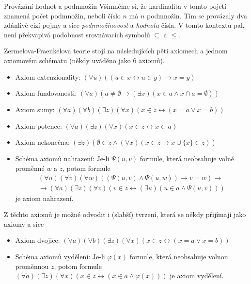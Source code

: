 \begin{myremark}{Provázání hodnot a podmnožin}\label{pozn:kard_podm}
Všimněme si, že kardinalita v tomto pojetí znamená počet podmnožin, neboli číslo $n$ má $n$ podmnožin. Tím se provázaly dva zdánlivě cizí pojmy a sice \textit{podmnožinovost} a \textit{hodnota} čísla. V tomto kontextu pak není překvapivá podobnost srovnávacích symbolů $\subseteq$ a $\leq$.
\end{myremark}

Zermelova-Fraenkelova teorie stojí na následujících pěti axiomech a jednom axiomovém schématu (někdy uváděno jako 6 axiomů).

\begin{itemize}
\item Axiom extenzionality: $(\forall u)((u \in x \leftrightarrow u \in y) \rightarrow x = y)$
\item Axiom fundovanosti: $ (\forall a)(a \neq \emptyset \rightarrow (\exists x)(x \in a \land x \cap a = \emptyset))$
\item Axiom sumy: $(\forall a)(\forall b)(\exists z)(\forall x)(x \in z \leftrightarrow (x = a \lor x = b))$
\item Axiom potence: $(\forall a)(\exists z)(\forall x)(x \in z \leftrightarrow x \subset a)$
\item Axiom nekonečna: $(\exists z)(\emptyset \in z \land (\forall x)(x \in z \rightarrow x \cup \{ x \} \in z))$
\item Schéma axiomů nahrazení: Je-li $\Psi (u, v)$ formule, která neobsahuje volné proměnné $w$ a $z$, potom formule $$\begin{aligned}(\forall u)(\forall v)(\forall w)((\Psi (u,v) \land \Psi (u, w)) \rightarrow v = w) \rightarrow \\ \rightarrow (\forall a)(\exists z)(\forall v)(v \in z \leftrightarrow (\exists u)(u \in a \land \Psi (u,v))) \end{aligned}$$ je axiom nahrazení.
\end{itemize}

Z těchto axiomů je možné odvodit i (slabší) tvrzení, která se někdy přijímají jako axiomy a sice
\begin{itemize}
\item Axiom dvojice: $(\forall a)(\forall b)(\exists z)(\forall x)(x \in z \leftrightarrow (x = a \lor x = b))$
\item Schéma axiomů vydělení: Je-li $\varphi (x)$ formule, která neobsahuje volnou proměnnou $z$, potom formule $(\forall a)(\exists z)(\forall x)(x \in z \leftrightarrow  (x \in a \land \varphi (x)))$ je axiom vydělení.
\end{itemize}

